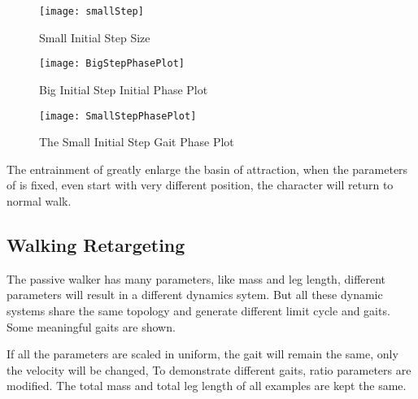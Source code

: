 \begin{figure}[!htbp]
  \begin{center}
      \texttt{[image: smallStep]}
    \caption{Small Initial Step Size}
    \label{fig:smallStepini}
\end{center}
\end{figure}


\begin{figure}[!htbp]
  \begin{center}
      \texttt{[image: BigStepPhasePlot]}
    \caption{Big Initial Step Initial Phase Plot}
    \label{fig:bigstepiniGaitPlot}
\end{center}
\end{figure}


\begin{figure}[!htbp]
  \begin{center}
      \texttt{[image: SmallStepPhasePlot]}
    \caption{The Small Initial Step Gait Phase Plot}
    \label{fig:smallstepiniPhasePlot}
\end{center}
\end{figure}

The entrainment of \cpg greatly enlarge the basin of attraction, when the parameters of \cpg is fixed, even start with very different position, the character will return to normal walk.





\subsection{Walking Retargeting}
The passive walker has many parameters, like mass and leg length, different parameters will result in a different dynamics sytem.
But all these dynamic systems  share the same topology and generate different limit cycle and gaits.
Some meaningful gaits are shown.

If all the parameters are scaled in uniform, the gait will remain the same, only the velocity will be changed,
To demonstrate different gaits, ratio parameters are modified. 
The total mass and total leg length of all examples are kept the same.




